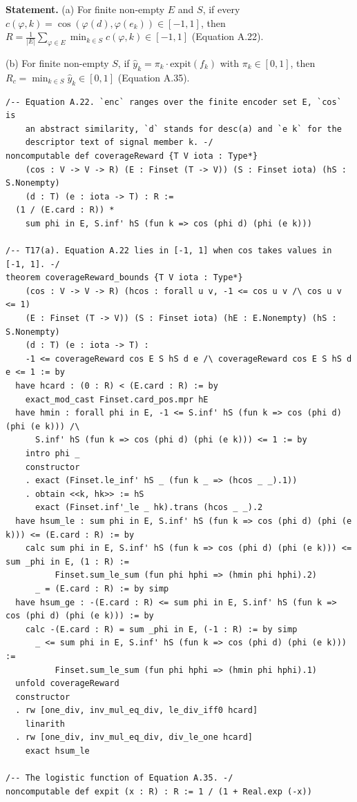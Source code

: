 \documentclass[11pt,a4paper]{article}
\begin{document}
	\textbf{Statement.} (a) For finite non-empty $E$ and $S$, if every $c(\varphi,k)=\cos(\varphi(d),\varphi(e_k))\in[-1,1]$, then
$R=\frac{1}{|E|}\sum_{\varphi\in E}\min_{k\in S}c(\varphi,k)\in[-1,1]$ (Equation A.22).

(b) For finite non-empty $S$, if $\hat y_k=\pi_k\cdot\text{expit}(f_k)$ with $\pi_k\in[0,1]$, then $R_c=\min_{k\in S}\hat y_k\in[0,1]$ (Equation A.35).

\begin{lstlisting}
/-- Equation A.22. `enc` ranges over the finite encoder set E, `cos` is
    an abstract similarity, `d` stands for desc(a) and `e k` for the
    descriptor text of signal member k. -/
noncomputable def coverageReward {T V iota : Type*}
    (cos : V -> V -> R) (E : Finset (T -> V)) (S : Finset iota) (hS : S.Nonempty)
    (d : T) (e : iota -> T) : R :=
  (1 / (E.card : R)) *
    sum phi in E, S.inf' hS (fun k => cos (phi d) (phi (e k)))

/-- T17(a). Equation A.22 lies in [-1, 1] when cos takes values in [-1, 1]. -/
theorem coverageReward_bounds {T V iota : Type*}
    (cos : V -> V -> R) (hcos : forall u v, -1 <= cos u v /\ cos u v <= 1)
    (E : Finset (T -> V)) (S : Finset iota) (hE : E.Nonempty) (hS : S.Nonempty)
    (d : T) (e : iota -> T) :
    -1 <= coverageReward cos E S hS d e /\ coverageReward cos E S hS d e <= 1 := by
  have hcard : (0 : R) < (E.card : R) := by
    exact_mod_cast Finset.card_pos.mpr hE
  have hmin : forall phi in E, -1 <= S.inf' hS (fun k => cos (phi d) (phi (e k))) /\
      S.inf' hS (fun k => cos (phi d) (phi (e k))) <= 1 := by
    intro phi _
    constructor
    . exact (Finset.le_inf' hS _ (fun k _ => (hcos _ _).1))
    . obtain <<k, hk>> := hS
      exact (Finset.inf'_le _ hk).trans (hcos _ _).2
  have hsum_le : sum phi in E, S.inf' hS (fun k => cos (phi d) (phi (e k))) <= (E.card : R) := by
    calc sum phi in E, S.inf' hS (fun k => cos (phi d) (phi (e k))) <= sum _phi in E, (1 : R) :=
          Finset.sum_le_sum (fun phi hphi => (hmin phi hphi).2)
      _ = (E.card : R) := by simp
  have hsum_ge : -(E.card : R) <= sum phi in E, S.inf' hS (fun k => cos (phi d) (phi (e k))) := by
    calc -(E.card : R) = sum _phi in E, (-1 : R) := by simp
      _ <= sum phi in E, S.inf' hS (fun k => cos (phi d) (phi (e k))) :=
          Finset.sum_le_sum (fun phi hphi => (hmin phi hphi).1)
  unfold coverageReward
  constructor
  . rw [one_div, inv_mul_eq_div, le_div_iff0 hcard]
    linarith
  . rw [one_div, inv_mul_eq_div, div_le_one hcard]
    exact hsum_le

/-- The logistic function of Equation A.35. -/
noncomputable def expit (x : R) : R := 1 / (1 + Real.exp (-x))


\end{lstlisting}
\end{document}
